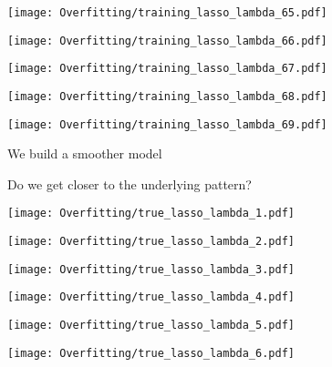 \documentclass[xcolor=pdftex,dvipsnames,table]{beamer}
\begin{document}
\frame
{
	\begin{center}
		\texttt{[image: Overfitting/training\_lasso\_lambda\_65.pdf]}
	\end{center}
}

\frame
{
	\begin{center}
		\texttt{[image: Overfitting/training\_lasso\_lambda\_66.pdf]}
	\end{center}
}

\frame
{
	\begin{center}
		\texttt{[image: Overfitting/training\_lasso\_lambda\_67.pdf]}
	\end{center}
}

\frame
{
	\begin{center}
		\texttt{[image: Overfitting/training\_lasso\_lambda\_68.pdf]}
	\end{center}
}

\frame
{
	\begin{center}
		\texttt{[image: Overfitting/training\_lasso\_lambda\_69.pdf]}
	\end{center}
}

\frame
{
	We build a smoother model
}

\frame
{
	Do we get closer to the underlying pattern?
}

\frame
{
	\begin{center}
		\texttt{[image: Overfitting/true\_lasso\_lambda\_1.pdf]}
	\end{center}
}

\frame
{
	\begin{center}
		\texttt{[image: Overfitting/true\_lasso\_lambda\_2.pdf]}
	\end{center}
}

\frame
{
	\begin{center}
		\texttt{[image: Overfitting/true\_lasso\_lambda\_3.pdf]}
	\end{center}
}

\frame
{
	\begin{center}
		\texttt{[image: Overfitting/true\_lasso\_lambda\_4.pdf]}
	\end{center}
}

\frame
{
	\begin{center}
		\texttt{[image: Overfitting/true\_lasso\_lambda\_5.pdf]}
	\end{center}
}

\frame
{
	\begin{center}
		\texttt{[image: Overfitting/true\_lasso\_lambda\_6.pdf]}
	\end{center}
}
\end{document}
